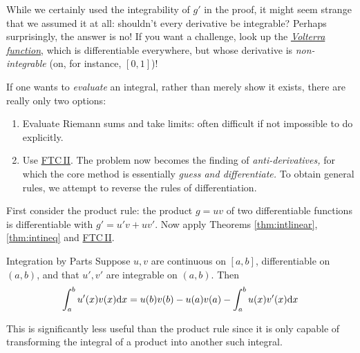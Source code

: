 While we certainly used the integrability of $g'$ in the proof, it might seem strange that we assumed it at all: shouldn't every derivative be integrable? Perhaps surprisingly, the answer is no! If you want a challenge, look up the \href{https://en.wikipedia.org/wiki/Volterra's_function}{\emph{Volterra function}}, which is differentiable everywhere, but whose derivative is \emph{non-integrable} (on, for instance, $[0,1]$)!



If one wants to \emph{evaluate} an integral, rather than merely show it exists, there are really only two options:
\begin{enumerate}
  \item Evaluate Riemann sums and take limits: often difficult if not impossible to do explicitly.
  \item Use \hyperref[thm:ftc2]{FTC\,II}. The problem now becomes the finding of \emph{anti-derivatives,} for which the core method is essentially \emph{guess and differentiate.} To obtain general rules, we attempt to reverse the rules of differentiation.
\end{enumerate}




First consider the product rule: the product $g=uv$ of two differentiable functions is differentiable with $g'=u'v+uv'$.
Now apply Theorems \ref{thm:intlinear}, \ref{thm:intineq} and \hyperref[thm:ftc2]{FTC\,II}.

\begin{cor}{Integration by Parts}{}
Suppose $u,v$ are continuous on $[a,b]$, differentiable on $(a,b)$, and that $u',v'$ are integrable on $(a,b)$. Then
\[\int_a^bu'(x)v(x){\mathrm{d} x}=u(b)v(b)-u(a)v(a)-\int_a^bu(x)v'(x){\mathrm{d} x}\]
\end{cor}

This is significantly less useful than the product rule since it is only capable of transforming the integral of a product into another such integral.
\goodbreak

